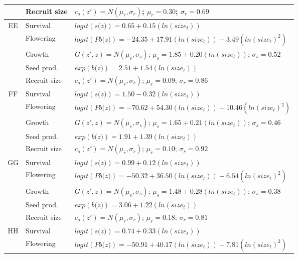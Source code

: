 \documentclass[12pt, letterpaper]{article}
\begin{document}
\begin{spacing}{1.3}
\begin{longtable}[ht]{c|l|p{}}
         & Recruit size  &  $c_o(z') = N(\mu_r, \sigma_r)$; $\mu_r = 0.30$; $\sigma_r = 0.69$ \\
         \hline
         \rowcolor[gray]{.95}EE  &  Survival  &  $logit(\textit{s(z)})= 0.65+0.15(ln(size_t))$ \\
         & Flowering  & $logit(\textit{Pb(z)})  = -24.35 + 17.91(ln(size_t)) -3.49(ln(size_t)^2)$ \\
         \rowcolor[gray]{.95}& Growth  &  $G(z',z) = N(\mu_s, \sigma_s)$; $\mu_s = 1.85 + 0.20(ln(size_t))$; $\sigma_s = 0.52$\\
         & Seed prod.  & $exp(\textit{b(z)}) = 2.51 + 1.54(ln(size_t))$  \\
         \rowcolor[gray]{.95}& Recruit size  &  $c_o(z') = N(\mu_r, \sigma_r)$; $\mu_r = 0.09$; $\sigma_r = 0.86$ \\
         \hline
         FF  &  Survival  &  $logit(\textit{s(z)})= 1.50-0.32(ln(size_t))$ \\
         \rowcolor[gray]{.95}& Flowering  & $logit(\textit{Pb(z)})  = -70.62 + 54.30(ln(size_t)) -10.46(ln(size_t)^2)$ \\
         & Growth  &  $G(z',z) = N(\mu_s, \sigma_s)$; $\mu_s = 1.65 + 0.21(ln(size_t))$; $\sigma_s = 0.46$\\
         \rowcolor[gray]{.95}& Seed prod.  & $exp(\textit{b(z)}) = 1.91 + 1.39(ln(size_t))$  \\
         & Recruit size  &  $c_o(z') = N(\mu_r, \sigma_r)$; $\mu_r = 0.10$; $\sigma_r = 0.92$ \\
        \hline
         \rowcolor[gray]{.95}GG  &  Survival  &  $logit(\textit{s(z)})= 0.99+0.12(ln(size_t))$ \\
         & Flowering  & $logit(\textit{Pb(z)})  = -50.32 + 36.50(ln(size_t)) -6.54(ln(size_t)^2)$ \\
         \rowcolor[gray]{.95}& Growth  &  $G(z',z) = N(\mu_s, \sigma_s)$; $\mu_s = 1.48 + 0.28(ln(size_t))$; $\sigma_s = 0.38$\\
         & Seed prod.  & $exp(\textit{b(z)}) = 3.06 + 1.22(ln(size_t))$  \\
         \rowcolor[gray]{.95}& Recruit size  &  $c_o(z') = N(\mu_r, \sigma_r)$; $\mu_r = 0.18$; $\sigma_r = 0.81$ \\ \hline
         HH  &  Survival  &  $logit(\textit{s(z)})= 0.74+0.33(ln(size_t))$ \\
         \rowcolor[gray]{.95}& Flowering  & $logit(\textit{Pb(z)})  = -50.91 + 40.17(ln(size_t)) -7.81(ln(size_t)^2)$ \\

\end{longtable}
\end{spacing}
\end{document}

